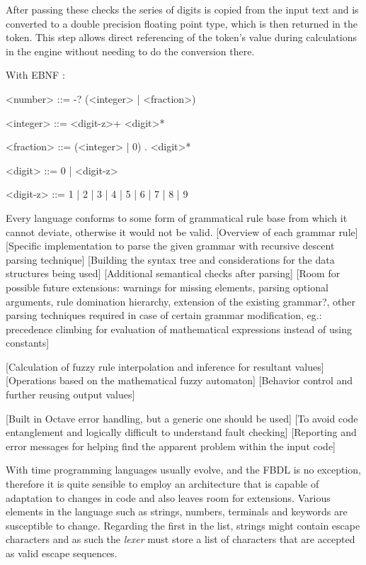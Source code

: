 After passing these checks the series of digits is copied from the input text and is converted to a double precision floating point type, which is then returned in the token. This step allows direct referencing of the token's value during calculations in the engine without needing to do the conversion there.

With EBNF :
\begin{grammar}
<number> ::=  -?  (<integer> | <fraction>)

<integer> ::= <digit-z>+ <digit>*

<fraction> ::= (<integer> | 0) . <digit>*

<digit> ::= 0 | <digit-z>

<digit-z> ::= 1 | 2 | 3 | 4 | 5 | 6 | 7 | 8 | 9

\end{grammar}

Every language conforms to some form of grammatical rule base from which it cannot deviate, otherwise it would not be valid.
[Overview of each grammar rule]
[Specific implementation to parse the given grammar with recursive descent parsing technique]
[Building the syntax tree and considerations for the data structures being used]
[Additional semantical checks after parsing]
[Room for possible future extensions: warnings for missing elements, parsing optional arguments, rule domination hierarchy, extension of the existing grammar?, other parsing techniques required in case of certain grammar modification, eg.: precedence climbing for evaluation of mathematical expressions instead of using constants]

[Calculation of fuzzy rule interpolation and inference for resultant values]
[Operations based on the mathematical fuzzy automaton]
[Behavior control and further reusing output values]

[Built in Octave error handling, but a generic one should be used]
[To avoid code entanglement and logically difficult to understand fault checking]
[Reporting and error messages for helping find the apparent problem within the input code]

With time programming languages usually evolve, and the FBDL is no exception, therefore it is quite sensible to employ an architecture that is capable of adaptation to changes in code and also leaves room for extensions. Various elements in the language such as strings, numbers, terminals and keywords are susceptible to change. Regarding the first in the list, strings might contain escape characters and as such the \textit{lexer} must store a list of characters that are accepted as valid escape sequences. 
